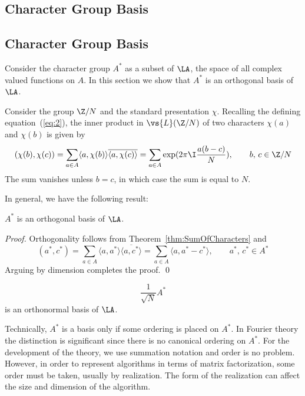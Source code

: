 {\subsection{Character Group Basis}}
{\subsection{Character Group Basis\protect\footnotemark}
}
Consider the character group $A^*$ as a subset of $\LA$, the space of all
complex valued functions on $A$.  In this section we show that $A^*$ is an
orthogonal basis of $\LA$.
\begin{example}
Consider the group $\Z/N$ and the standard presentation $\chi$.  Recalling the
defining equation~(\ref{eq:2}), the inner product  in $\vs{L}(\Z/N)$ of two
characters $\chi(a)$ and $\chi(b)$ is given by  
\[
(\chi(b),\chi(c)) = \sum_{a\in A} \langle a,\chi(b) \rangle \overline{\langle a,\chi(c) \rangle}
= \sum_{a\in A} \exp (2\pi \I \frac{a(b-c)}{N}),
\qquad b,\, c \in \Z/N
\]
The sum vanishes unless $b=c$, in which case the sum is equal to $N$.  
\end{example}
In general, we have the following result:
\begin{theorem}
$A^*$ is an orthogonal basis of $\LA$.
\end{theorem}
\begin{proof}
Orthogonality follows from Theorem~\ref{thm:SumOfCharacters} and 
\[
(a^*,c^*) = \sum_{a \in A} \langle a, a^* \rangle \overline{\langle a, c^*
  \rangle}
= \sum_{a \in A} \langle a, a^* - c^* \rangle, \qquad a^*,\, c^* \in A^*
\]
Arguing by dimension completes the proof. \qed
\end{proof}
\begin{corollary}
\[
\frac{1}{\sqrt{N}} A^*
\]
is an orthonormal basis of $\LA$. 
\end{corollary}
Technically, $A^*$ is a basis only if some ordering is placed on $A^*$.
In Fourier theory the distinction is significant since there is no canonical
ordering on $A^*$.  For the development of the theory, we use summation
notation and order is no problem. However, in order to represent algorithms in
terms of matrix factorization, some order must be taken, usually by
realization.  The form of the realization can affect the size and dimension of
the algorithm. 

